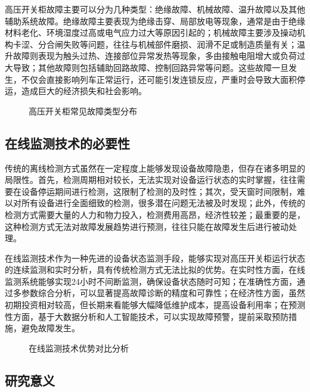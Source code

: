 高压开关柜故障主要可以分为几种类型：绝缘故障、机械故障、温升故障以及其他辅助系统故障。绝缘故障主要表现为绝缘击穿、局部放电等现象，通常是由于绝缘材料老化、环境湿度过高或电气应力过大等原因引起的；机械故障主要涉及操动机构卡涩、分合闸失败等问题，往往与机械部件磨损、润滑不足或制造质量有关；温升故障则表现为触头过热、连接部位异常发热等现象，多由接触电阻增大或负荷过大导致；其他故障则包括辅助回路故障、控制回路异常等问题。这些故障一旦发生，不仅会直接影响列车正常运行，还可能引发连锁反应，严重时会导致大面积停运，造成巨大的经济损失和社会影响。

\begin{figure}[h]
\centering
\caption{高压开关柜常见故障类型分布}
\label{fig:switchgear_fault_types}
\end{figure}

\subsection{在线监测技术的必要性}

传统的离线检测方式虽然在一定程度上能够发现设备故障隐患，但存在诸多明显的局限性。首先，检测周期相对较长，无法实现对设备运行状态的实时掌握，往往需要在设备停运期间进行检测，这限制了检测的及时性；其次，受天窗时间限制，难以对所有设备进行全面细致的检测，很多潜在问题无法被及时发现；此外，传统的检测方式需要大量的人力和物力投入，检测费用高昂，经济性较差；最重要的是，这种检测方式无法对故障发展趋势进行预测，往往只能在故障发生后进行被动处理。

在线监测技术作为一种先进的设备状态监测手段，能够实现对高压开关柜运行状态的连续监测和实时分析，具有传统检测方式无法比拟的优势。在实时性方面，在线监测系统能够实现24小时不间断监测，确保设备状态随时可知；在准确性方面，通过多参数综合分析，可以显著提高故障诊断的精度和可靠性；在经济性方面，虽然初期投资相对较高，但长期来看能够大幅降低维护成本，提高设备利用率；在预测性方面，基于大数据分析和人工智能技术，可以实现故障预警，提前采取预防措施，避免故障发生。

\begin{figure}[h]
\centering
\caption{在线监测技术优势对比分析}
\label{fig:monitoring_advantage}
\end{figure}

\subsection{研究意义}


